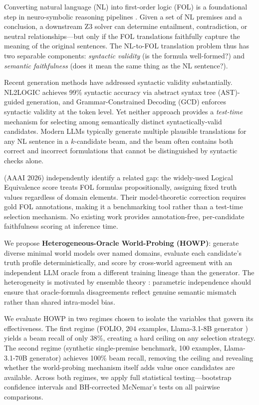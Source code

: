 \documentclass[11pt,letterpaper]{article}
\begin{document}
Converting natural language (NL) into first-order logic (FOL) is a foundational step in neuro-symbolic reasoning pipelines \citep{Olausson2023, Pan2023, Wei2022}. Given a set of NL premises and a conclusion, a downstream Z3 solver can determine entailment, contradiction, or neutral relationships---but only if the FOL translations faithfully capture the meaning of the original sentences. The NL-to-FOL translation problem thus has two separable components: \emph{syntactic validity} (is the formula well-formed?) and \emph{semantic faithfulness} (does it mean the same thing as the NL sentence?).

Recent generation methods have addressed syntactic validity substantially. NL2LOGIC \citep{Putra2025} achieves 99\% syntactic accuracy via abstract syntax tree (AST)-guided generation, and Grammar-Constrained Decoding (GCD) \citep{Geng2023} enforces syntactic validity at the token level. Yet neither approach provides a \emph{test-time} mechanism for selecting among semantically distinct syntactically-valid candidates. Modern LLMs typically generate multiple plausible translations for any NL sentence in a $k$-candidate beam, and the beam often contains both correct and incorrect formulations that cannot be distinguished by syntactic checks alone.

\citet{Brunello2026} (AAAI 2026) independently identify a related gap: the widely-used Logical Equivalence score treats FOL formulas propositionally, assigning fixed truth values regardless of domain elements. Their model-theoretic correction requires gold FOL annotations, making it a benchmarking tool rather than a test-time selection mechanism. No existing work provides annotation-free, per-candidate faithfulness scoring at inference time.

We propose \textbf{Heterogeneous-Oracle World-Probing (HOWP)}: generate diverse minimal world models over named domains, evaluate each candidate's truth profile deterministically, and score by cross-world agreement with an independent LLM oracle from a different training lineage than the generator. The heterogeneity is motivated by ensemble theory \citep{Breiman2001, Lakshminarayanan2017}: parametric independence should ensure that oracle-formula disagreements reflect genuine semantic mismatch rather than shared intra-model bias.

We evaluate HOWP in two regimes chosen to isolate the variables that govern its effectiveness. The first regime (FOLIO, 204 examples, Llama-3.1-8B generator \citep{Dubey2024}) yields a beam recall of only 38\%, creating a hard ceiling on any selection strategy. The second regime (synthetic single-premise benchmark, 100 examples, Llama-3.1-70B generator) achieves 100\% beam recall, removing the ceiling and revealing whether the world-probing mechanism itself adds value once candidates are available. Across both regimes, we apply full statistical testing---bootstrap confidence intervals and BH-corrected McNemar's tests on all pairwise comparisons.
\end{document}
